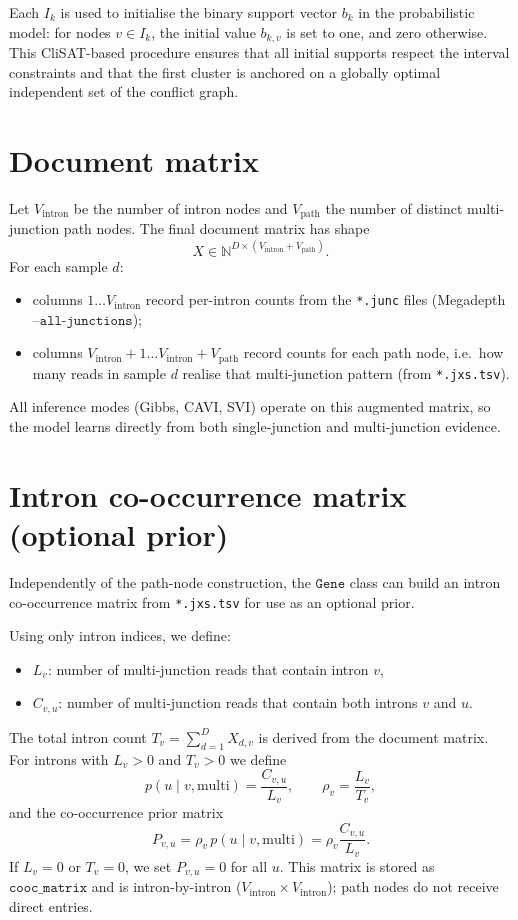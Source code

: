 \documentclass[11pt]{article}
\begin{document}
Each \(I_k\) is used to initialise the binary support vector \(b_k\) in the
probabilistic model: for nodes \(v \in I_k\), the initial value \(b_{k,v}\)
is set to one, and zero otherwise. This CliSAT-based procedure ensures that
all initial supports respect the interval constraints and that the first
cluster is anchored on a globally optimal independent set of the conflict
graph.

\section{Document matrix}

Let \(V_{\text{intron}}\) be the number of intron nodes and \(V_{\text{path}}\)
the number of distinct multi-junction path nodes. The final document matrix
has shape
\[
  X \in \mathbb{N}^{D \times (V_{\text{intron}} + V_{\text{path}})}.
\]
For each sample \(d\):
\begin{itemize}
  \item columns \(1\ldots V_{\text{intron}}\) record per-intron counts from
  the \texttt{*.junc} files (Megadepth \(\texttt{--all-junctions}\));
  \item columns \(V_{\text{intron}}+1\ldots V_{\text{intron}}+V_{\text{path}}\)
  record counts for each path node, i.e.\ how many reads in sample \(d\)
  realise that multi-junction pattern (from \texttt{*.jxs.tsv}).
\end{itemize}

All inference modes (Gibbs, CAVI, SVI) operate on this augmented matrix, so
the model learns directly from both single-junction and multi-junction
evidence.

\section{Intron co-occurrence matrix (optional prior)}

Independently of the path-node construction, the \(\texttt{Gene}\) class
can build an intron co-occurrence matrix from \texttt{*.jxs.tsv} for use as
an optional prior.

Using only intron indices, we define:
\begin{itemize}
  \item \(L_v\): number of multi-junction reads that contain intron \(v\),
  \item \(C_{v,u}\): number of multi-junction reads that contain both
  introns \(v\) and \(u\).
\end{itemize}
The total intron count
\(
  T_v = \sum_{d=1}^D X_{d,v}
\)
is derived from the document matrix. For introns with \(L_v > 0\) and
\(T_v > 0\) we define
\[
  p(u \mid v, \text{multi}) = \frac{C_{v,u}}{L_v},\qquad
  \rho_v = \frac{L_v}{T_v},
\]
and the co-occurrence prior matrix
\[
  P_{v,u} = \rho_v\,p(u \mid v, \text{multi}) =
            \rho_v \frac{C_{v,u}}{L_v}.
\]
If \(L_v = 0\) or \(T_v = 0\), we set \(P_{v,u}=0\) for all \(u\). This
matrix is stored as \(\texttt{cooc\_matrix}\) and is intron-by-intron
(\(V_{\text{intron}} \times V_{\text{intron}}\)); path nodes do not receive
direct entries.
\end{document}
